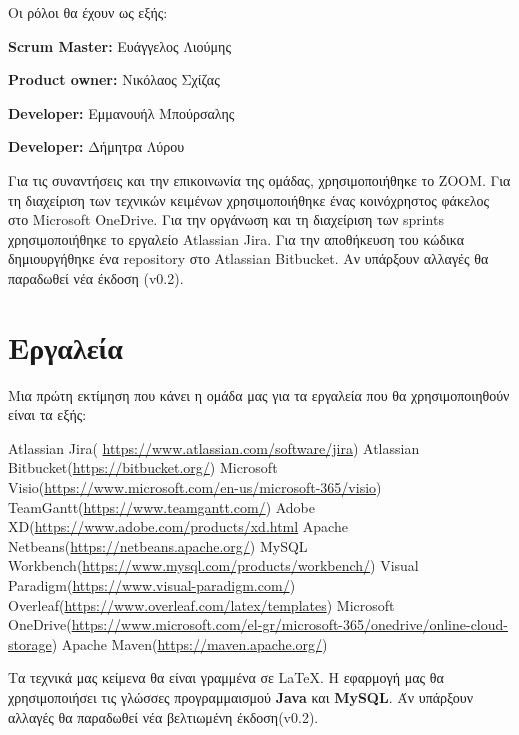 \documentclass[12pt,a4paper,oneside]{article}
\begin{document}
{Οι ρόλοι θα έχουν ως εξής: }
\vspace{5mm}


\centerline {\textbf{Scrum Master:} Ευάγγελος Λιούμης }

\centerline {\textbf{Product owner:} Νικόλαος Σχίζας }

\centerline {\textbf{Developer:} Εμμανουήλ Μπούρσαλης }

\centerline {\textbf{Developer:} Δήμητρα Λύρου }
\vspace{0.7cm}
Για τις συναντήσεις και την επικοινωνία της ομάδας, χρησιμοποιήθηκε το ZOOM. Για τη διαχείριση των τεχνικών κειμένων χρησιμοποιήθηκε ένας κοινόχρηστος φάκελος στο Microsoft OneDrive. Για την οργάνωση και τη διαχείριση των sprints χρησιμοποιήθηκε το εργαλείο Atlassian Jira. Για την αποθήκευση του κώδικα δημιουργήθηκε ένα repository στο Atlassian Bitbucket. Αν υπάρξουν αλλαγές θα παραδωθεί νέα έκδοση (v0.2). 

\section{Εργαλεία}\label{sec:res}

Μια πρώτη εκτίμηση που κάνει η ομάδα μας για τα εργαλεία που θα χρησιμοποιηθούν είναι τα εξής:

Atlassian Jira( \url{https://www.atlassian.com/software/jira})
\newline
Atlassian Bitbucket(\url{https://bitbucket.org/})
\newline
Microsoft Visio(\url{https://www.microsoft.com/en-us/microsoft-365/visio})
\newline
TeamGantt(\url{https://www.teamgantt.com/})
\newline
Adobe XD(\url{https://www.adobe.com/products/xd.html}
\newline
Apache Netbeans(\url{https://netbeans.apache.org/})
\newline
MySQL Workbench(\url{https://www.mysql.com/products/workbench/})
\newline
Visual Paradigm(\url{https://www.visual-paradigm.com/})
\newline
Overleaf(\url{https://www.overleaf.com/latex/templates})
\newline
Microsoft OneDrive(\url{https://www.microsoft.com/el-gr/microsoft-365/onedrive/online-cloud-storage})
\newline
Apache Maven(\url{https://maven.apache.org/})


Τα τεχνικά μας κείμενα θα είναι γραμμένα σε \LaTeX. Η εφαρμογή μας θα χρησιμοποιήσει τις γλώσσες προγραμμαισμού \textbf{Java} και \textbf{MySQL}. Άν υπάρξουν αλλαγές θα παραδωθεί νέα βελτιωμένη έκδοση(v0.2).
\newpage



\end{document}
